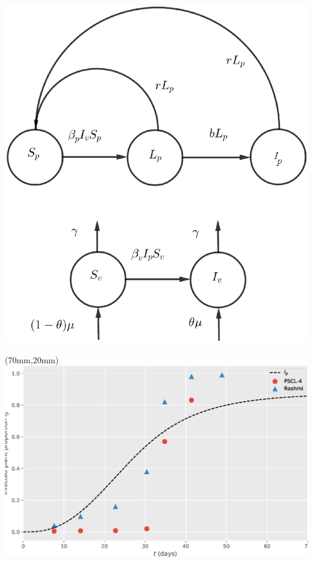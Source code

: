 \begin{frame}[plain]
{\begin{textblock*}{60mm}
				\includegraphics[width=\linewidth]{Feathergraphics/plant_diagram.eps}
			\end{textblock*}
		}
		{
			\begin{textblock*}{55mm}(70mm,20mm)
				\includegraphics[width=\linewidth]{Feathergraphics/Simulation_data.eps}
			\end{textblock*}
		}
	\end{frame}
